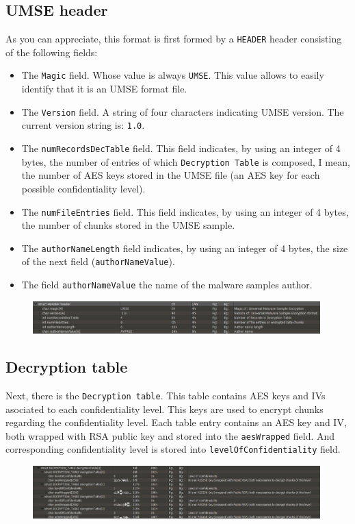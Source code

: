 \subsection{UMSE header}
As you can appreciate, this format is first formed by a \texttt{HEADER} header
consisting of the following fields:
\begin{itemize}
\item The \texttt{Magic} field. Whose value is always \texttt{UMSE}. This value
  allows to easily identify that it is an UMSE format file.
\item The \texttt{Version} field. A string of four characters indicating UMSE
  version. The current version string is: \texttt{1.0}.
\item The \texttt{numRecordsDecTable} field. This field indicates, by using an
  integer of 4 bytes, the number of entries of which \texttt{Decryption Table}
  is composed, I mean, the number of AES keys stored in the UMSE file (an AES
  key for each possible confidentiality level).
\item The \texttt{numFileEntries} field. This field indicates, by using an
  integer of 4 bytes, the number of chunks stored in the UMSE sample.
\item The \texttt{authorNameLength} field indicates, by using an integer of 4
  bytes, the size of the next field (\texttt{authorNameValue}).
\item The field \texttt{authorNameValue} the name of the malware samples
  author.
\end{itemize}
\begin{figure}[h]
  \centering
  \includegraphics[width=0.99\textwidth]{./figures/UMSEHeader}
\end{figure}

\subsection{Decryption table}

Next, there is the \texttt{Decryption table}. This table contains AES
keys and IVs asociated to each confidentiality level. This keys are used to
encrypt chunks regarding the confidentiality level.  Each table entry contains
an AES key and IV, both wrapped with RSA public key and stored into the
\texttt{aesWrapped} field. And corresponding confidentiality level is stored
into \texttt{levelOfConfidentiality} field.
\begin{figure}[h]
  \centering
  \includegraphics[width=0.99\textwidth]{./figures/UMSEDT}
\end{figure}

